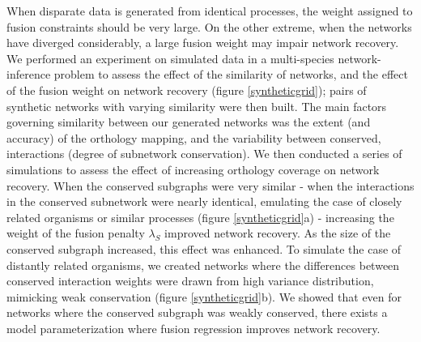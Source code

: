 \documentclass[11pt]{article}
\begin{document}
When disparate data is generated from identical processes, the weight assigned to fusion constraints should be very large. 
On the other extreme, when the networks have diverged considerably, a large fusion weight may impair network recovery. 
We performed an experiment on simulated data in a multi-species network-inference problem to assess the effect of the similarity of networks, and the effect of the fusion weight on network recovery (figure \ref{syntheticgrid}); pairs of synthetic networks with varying similarity were then built. 
The main factors governing similarity between our generated networks was the extent (and accuracy) of the orthology mapping, and the variability between conserved, interactions (degree of subnetwork conservation). 
We then conducted a series of simulations to assess the effect of increasing orthology coverage on network recovery.
When the conserved subgraphs were very similar - when the interactions in the conserved subnetwork were nearly identical, emulating the case of closely related organisms or similar processes (figure \ref{syntheticgrid}a) - increasing the weight of the fusion penalty $\lambda_S$ improved network recovery. As the size of the conserved subgraph increased, this effect was enhanced.
To simulate the case of distantly related organisms, we created networks where the differences between conserved interaction weights were drawn from high variance distribution, mimicking weak conservation (figure \ref{syntheticgrid}b). 
We showed that even for networks where the conserved subgraph was weakly conserved, there exists a model parameterization where fusion regression improves network recovery. 
\end{document}
